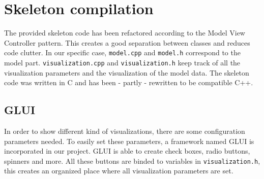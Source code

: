 \section{Skeleton compilation}
    The provided skeleton code has been refactored according to the Model View Controller pattern. This creates a good separation between classes and reduces code clutter. In our specific case, \texttt{model.cpp} and \texttt{model.h} correspond to the model part. \texttt{visualization.cpp} and \texttt{visualization.h} keep track of all the visualization parameters and the visualization of the model data.
    The skeleton code was written in C and has been - partly - rewritten to be compatible C++.

    \subsection*{GLUI}
        In order to show different kind of visualizations, there are some configuration parameters needed. To easily set these parameters, a framework named GLUI \cite{glui} is incorporated in our project. GLUI is able to create check boxes, radio buttons, spinners and more. All these buttons are binded to variables in \texttt{visualization.h}, this creates an organized place where all visualization parameters are set.